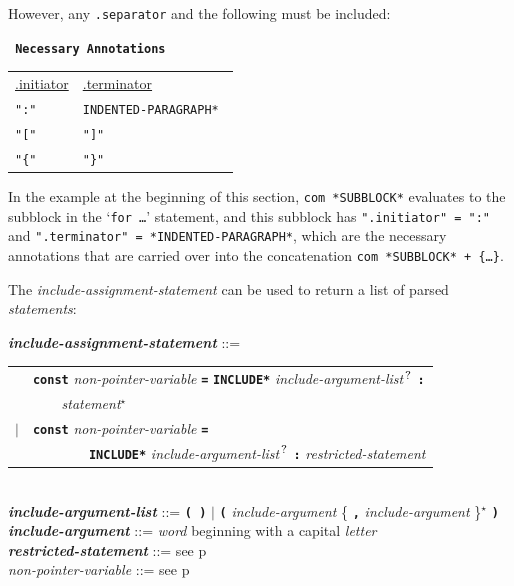 \documentclass[12pt]{article}
\newcommand{\TT}[1]{{\tt \bfseries #1}}
\newcommand{\STAR}{{\Large $^\star$}}
\newcommand{\QMARK}{{$^{\,\mbox{\footnotesize ?}}$}}
\newcommand{\emkey}[1]{{\em \bfseries #1}}
\newcommand{\pagref}[1]{p\pageref{#1}}
\newenvironment{indpar}[1][0.3in]%
	{\begin{list}{}%
		     {\setlength{\itemsep}{0in}%
		      \setlength{\topsep}{0in}%
		      \setlength{\parsep}{1ex}%
		      \setlength{\labelwidth}{#1}%
		      \setlength{\leftmargin}{#1}%
		      \addtolength{\leftmargin}{\labelsep}}%
	 \item}%
	{\end{list}}
\begin{document}
However, any {\tt .separator} and the following must be included:

\begin{center} \tt
{\rm \bf Necessary Annotations}
\\[1ex]
\begin{tabular}{l@{~~~~~~~~~~}l}
\underline{.initiator} & \underline{.terminator}
\\[1ex]
\tt ":" & \tt *INDENTED-PARAGRAPH* \\
\tt "[" & \tt "]" \\
\tt "\{" & \tt "\}" \\
\end{tabular}
\end{center}

In the example at the beginning of this section,
{\tt com *SUBBLOCK*} evaluates to the
subblock in the `{\tt for \ldots}' statement, and this subblock
has {\tt ".initiator" = ":"} and {\tt ".terminator" = *INDENTED-PARA\-GRAPH*},
which are the necessary annotations that are carried over into
the concatenation
{\tt com *SUBBLOCK* + \{\ldots\}}.

The {\em include-assignment-statement} can be used to return a list
of parsed {\em statements}:

\begin{indpar}
\emkey{include-assignment-statement}\label{INCLUDE-ASSIGNMENT-STATEMENT} ::= \\
\hspace*{0.3in}
    \begin{tabular}[t]{rl}
    & \TT{const} {\em non-pointer-variable} \TT{=} \TT{*INCLUDE*}
    	{\em include-argument-list}\QMARK{} \TT{:} \\
    & \TT{~~~~}{\em statement}\STAR{} \\
    $|$ & \TT{const} {\em non-pointer-variable} \TT{=} \\
    & ~~~~~~~~\TT{*INCLUDE*}
    	{\em include-argument-list}\QMARK{} \TT{:}
	{\em restricted-statement} \\
    \end{tabular}
\\[0.5ex]
\emkey{include-argument-list} ::= \TT{( )} $|$
	\TT{(} {\em include-argument}
	\{ \TT{,} {\em include-argument} \}\STAR{} \TT{)}
\\[0.5ex]
\emkey{include-argument} ::= {\em word} beginning with a capital {\em letter}
\\[0.5ex]
\emkey{restricted-statement} ::= see \pagref{RESTRICTED-STATEMENT}
\\[0.5ex]
{\em non-pointer-variable} ::= see \pagref{NON-POINTER-VARIABLE}

\end{indpar}
\end{document}
